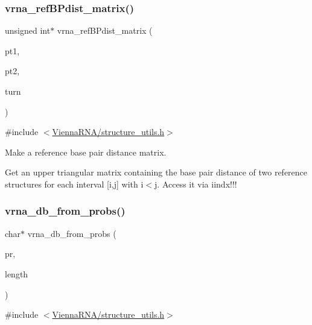 \subsubsection{\texorpdfstring{vrna\+\_\+ref\+B\+Pdist\+\_\+matrix()}{vrna\_refBPdist\_matrix()}}
{\footnotesize\ttfamily unsigned int$\ast$ vrna\+\_\+ref\+B\+Pdist\+\_\+matrix (\begin{DoxyParamCaption}\item[{const short $\ast$}]{pt1,  }\item[{const short $\ast$}]{pt2,  }\item[{unsigned int}]{turn }\end{DoxyParamCaption})}



{\ttfamily \#include $<$\mbox{\hyperlink{structure__utils_8h}{Vienna\+R\+N\+A/structure\+\_\+utils.\+h}}$>$}



Make a reference base pair distance matrix. 

Get an upper triangular matrix containing the base pair distance of two reference structures for each interval \mbox{[}i,j\mbox{]} with i$<$j. Access it via iindx!!! \mbox{\label{group__struct__utils_ga0c28c410a5ab22d6ab9c77a84e8d5b44}} 
\subsubsection{\texorpdfstring{vrna\+\_\+db\+\_\+from\+\_\+probs()}{vrna\_db\_from\_probs()}}
{\footnotesize\ttfamily char$\ast$ vrna\+\_\+db\+\_\+from\+\_\+probs (\begin{DoxyParamCaption}\item[{const \mbox{\hyperlink{group__data__structures_ga31125aeace516926bf7f251f759b6126}{F\+L\+T\+\_\+\+O\+R\+\_\+\+D\+BL}} $\ast$}]{pr,  }\item[{unsigned int}]{length }\end{DoxyParamCaption})}



{\ttfamily \#include $<$\mbox{\hyperlink{structure__utils_8h}{Vienna\+R\+N\+A/structure\+\_\+utils.\+h}}$>$}



